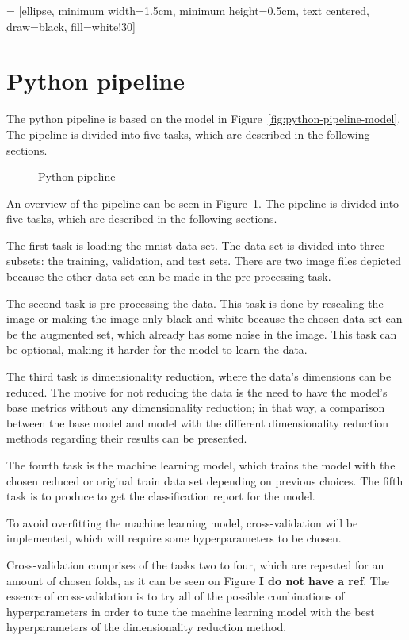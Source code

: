  = [ellipse, minimum width=1.5cm, minimum height=0.5cm, text centered, draw=black, fill=white!30]
\section{Python pipeline}\label{sec:python-pipeline}
The python pipeline is based on the model in Figure~\ref{fig:python-pipeline-model}. The pipeline is divided into five tasks, which are described in the following sections. 

\begin{figure}[htb!]
    \centering
    
    \caption{Python pipeline}
    \label{fig:Python-pipeline}
\end{figure}

An overview of the pipeline can be seen in Figure~\ref{fig:Python-pipeline}. The pipeline is divided into five tasks, which are described in the following sections. 

The first task is loading the \gls{mnist} data set. The data set is divided into three subsets: the training, validation, and test sets. There are two image files depicted because the other data set can be made in the pre-processing task.


The second task is pre-processing the data. This task is done by rescaling the image or making the image only black and white because the chosen data set can be the augmented set, which already has some noise in the image. This task can be optional, making it harder for the model to learn the data.


The third task is dimensionality reduction, where the data's dimensions can be reduced. The motive for not reducing the data is the need to have the model's base metrics without any dimensionality reduction; in that way, a comparison between the base model and model with the different dimensionality reduction methods regarding their results can be presented.

The fourth task is the machine learning model, which trains the model with the chosen reduced or original train data set depending on previous choices. The fifth task is to produce to get the classification report for the model.

To avoid overfitting the machine learning model, cross-validation will be implemented, which will require some hyperparameters to be chosen.


Cross-validation comprises of the tasks two to four, which are repeated for an amount of chosen folds, as it can be seen on Figure \textbf{I do not have a ref}. The essence of cross-validation is to try all of the possible combinations of hyperparameters in order to tune the machine learning model with the best hyperparameters of the dimensionality reduction method.


